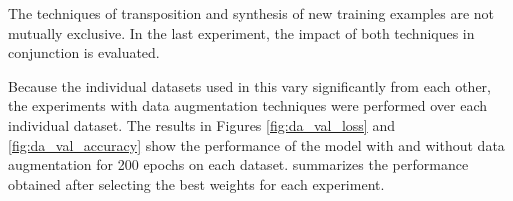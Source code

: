 
The techniques of transposition and synthesis of new
training examples are not mutually exclusive. In the last
experiment, the impact of both techniques in conjunction is
evaluated.

Because the individual datasets used in this \thesisdiss{}
vary significantly from each other, the experiments with
data augmentation techniques were performed over each
individual dataset. The results in Figures
\ref{fig:da_val_loss} and \ref{fig:da_val_accuracy} show the
performance of the model with and without data augmentation
for 200 epochs on each dataset. 
summarizes the performance obtained after selecting the best
weights for each experiment.



